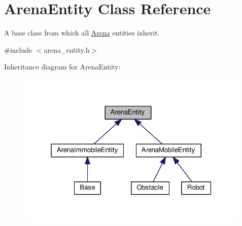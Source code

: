 \hypertarget{classArenaEntity}{}\section{Arena\+Entity Class Reference}
\label{classArenaEntity}


A base class from which all \hyperlink{classArena}{Arena} entities inherit.  




{\ttfamily \#include $<$arena\+\_\+entity.\+h$>$}



Inheritance diagram for Arena\+Entity\+:\nopagebreak
\begin{figure}[H]
\begin{center}
\leavevmode
\includegraphics[width=316pt]{classArenaEntity__inherit__graph}
\end{center}
\end{figure}
